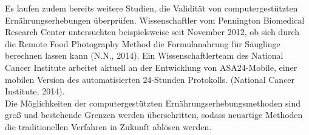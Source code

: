 Es laufen zudem bereits weitere Studien, die Validität von computergestützten Ernährungserhebungen überprüfen. Wissenschaftler vom Pennington Biomedical Research Center untersuchten beispielsweise seit November 2012, ob sich durch die Remote Food Photography Method die Formulanahrung für Säuglinge berechnen lassen kann (N.N., 2014). Ein Wissenschaftlerteam des National Cancer Institute arbeitet aktuell an der Entwicklung von ASA24-Mobile, einer mobilen Version des automatisierten 24-Stunden Protokolls. (National Cancer Institute, 2014).\\
Die Möglichkeiten der computergestützten Ernährungserhebungsmethoden sind groß und bestehende Grenzen werden überschritten, sodass neuartige Methoden die traditionellen Verfahren in Zukunft ablösen werden.
\newpage
